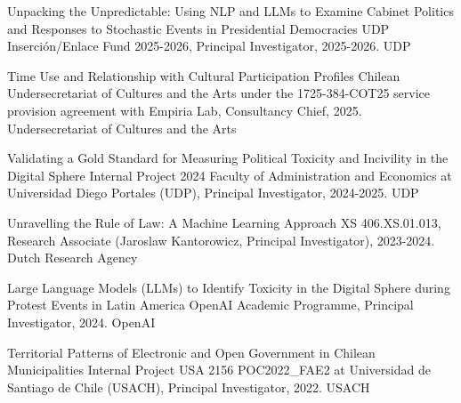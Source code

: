 \begin{cvhonors}
\cvhonor
{Unpacking the Unpredictable: Using NLP and LLMs to Examine Cabinet Politics and Responses to Stochastic Events in Presidential Democracies}
{UDP Inserción/Enlace Fund 2025-2026, Principal Investigator, 2025-2026.}
{UDP}
{\faCheckCircle}
\end{cvhonors}

\vspace{1mm}

\begin{cvhonors}
\cvhonor
{Time Use and Relationship with Cultural Participation Profiles}
{Chilean Undersecretariat of Cultures and the Arts under the 1725-384-COT25 service provision agreement with Empiria Lab, Consultancy Chief, 2025.}
{Undersecretariat of Cultures and the Arts}
{\faCheckCircle}
\end{cvhonors}

\vspace{1mm}

\begin{cvhonors}
\cvhonor
{Validating a Gold Standard for Measuring Political Toxicity and Incivility in the Digital Sphere}
{Internal Project 2024 Faculty of Administration and Economics at Universidad Diego Portales (UDP), Principal Investigator, 2024-2025.} %
{UDP}
{\faCheckCircle}
\end{cvhonors}

\vspace{1mm}

\begin{cvhonors}
\cvhonor
{Unravelling the Rule of Law: A Machine Learning Approach}
{XS 406.XS.01.013, Research Associate (Jaroslaw Kantorowicz, Principal Investigator), 2023-2024.} %
{Dutch Research Agency}
{\faCheckCircle}
\end{cvhonors}

\vspace{1mm}

\begin{cvhonors}
\cvhonor
{Large Language Models (LLMs) to Identify Toxicity in the Digital Sphere during Protest Events in Latin America}
{OpenAI Academic Programme, Principal Investigator, 2024.} %
{OpenAI}
{\faCheckCircle}
\end{cvhonors}

\vspace{1mm}

\begin{cvhonors}
\cvhonor
{Territorial Patterns of Electronic and Open Government in Chilean Municipalities}
{Internal Project USA 2156 POC2022\_FAE2 at  Universidad de Santiago de Chile (USACH), Principal Investigator, 2022.} %
{USACH}
{\faCheckCircle}
\end{cvhonors}

